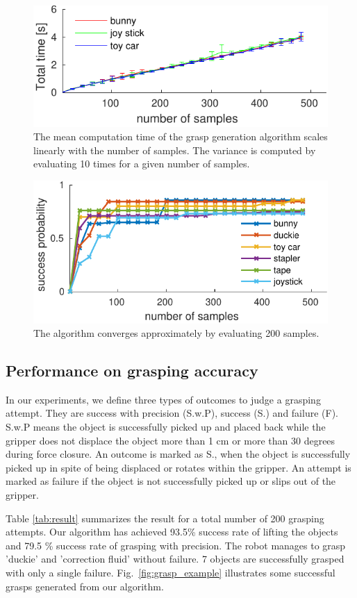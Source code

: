 \begin{figure}[!htpb]
\centering
\includegraphics[width=0.7\linewidth]{figure/algo_runtime2-crop.pdf}
\caption{The mean computation time of the grasp generation algorithm scales linearly with the number of samples. The variance is computed by evaluating 10 times for a given number of samples.}
\label{fig:algo_runtime}
\end{figure}


\begin{figure}[!htpb]
\centering
\includegraphics[width=0.7\linewidth]{figure/algo_prob2-crop.pdf}
\caption{The algorithm converges approximately by evaluating 200 samples.}
\label{fig:algo_prob}
\end{figure}


\subsection{Performance on grasping accuracy}
In our experiments, we define three types of outcomes to judge a grasping attempt. They are success with precision (S.w.P),  success (S.) and failure (F). S.w.P means the object is successfully picked up and placed back while the gripper does not displace the object more than 1 cm or more than 30 degrees during force closure. An outcome is marked as S., when the object is successfully picked up in spite of being displaced or rotates within the gripper. An attempt is marked as failure if the object is not successfully picked up or slips out of the gripper. 

Table \ref{tab:result} summarizes the result for a total number of 200 grasping attempts. Our algorithm has achieved 93.5\% success rate of lifting the objects and 79.5 \%  success rate of grasping with precision. The robot manages to grasp 'duckie' and 'correction fluid' without failure. 7 objects are successfully grasped with only a single failure. Fig.~\ref{fig:grasp_example} illustrates some successful grasps generated from our algorithm. 

